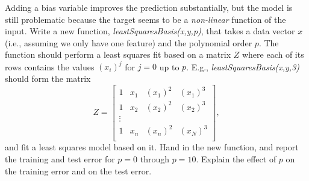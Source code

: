 \documentclass{article}
\def\blu#1{{\color{blu}#1}}
\begin{document}
Adding a bias variable improves the prediction substantially, but the model is still problematic because the target seems to be a \emph{non-linear} function of the input. Write a new function, \emph{leastSquaresBasis(x,y,p)}, that takes a data vector $x$ (i.e., assuming we only have one feature) and the polynomial order $p$. The function should perform a least squares fit based on a matrix $Z$ where each of its rows contains the values $(x_{i})^j$ for $j=0$ up to $p$. E.g., \emph{leastSquaresBasis(x,y,3)} should form the matrix
\[
Z = 
\left[\begin{array}{cccc}
1 & x_1 & (x_1)^2 & (x_1)^3\\
1 & x_2 & (x_2)^2 & (x_2)^3\\
\vdots\\
1 & x_n & (x_n)^2 & (x_N)^3\\
\end{array}
\right],
\]
and fit a least squares model based on it.
\blu{Hand in the new function, and report the training and test error for $p = 0$ through $p= 10$. Explain the effect of $p$ on the training error and on the test error.}
\end{document}
